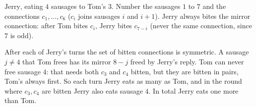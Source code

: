 $\boxed{\text{Jerry}}$, eating $4$ sausages to Tom's $3$. Number the sausages $1$ to $7$ and the connections $c_1,\dots,c_6$ ($c_i$ joins sausages $i$ and $i+1$). Jerry always bites the mirror connection: after Tom bites $c_i$, Jerry bites $c_{7-i}$ (never the same connection, since $7$ is odd).

After each of Jerry's turns the set of bitten connections is symmetric. A sausage $j\ne4$ that Tom frees has its mirror $8-j$ freed by Jerry's reply. Tom can never free sausage $4$: that needs both $c_3$ and $c_4$ bitten, but they are bitten in pairs, Tom's always first. So each turn Jerry eats as many as Tom, and in the round where $c_3,c_4$ are bitten Jerry also eats sausage $4$. In total Jerry eats one more than Tom.

